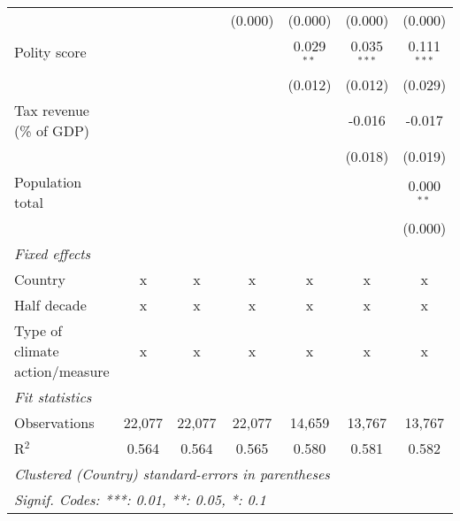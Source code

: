 \begin{tabular}{lcccccc}
                                                                               &         &                & (0.000)        & (0.000)        & (0.000)        & (0.000)\\   
   Polity score                                                                &         &                &                & 0.029$^{**}$   & 0.035$^{***}$  & 0.111$^{***}$\\   
                                                                               &         &                &                & (0.012)        & (0.012)        & (0.029)\\   
   Tax revenue (\% of GDP)                                                     &         &                &                &                & -0.016         & -0.017\\   
                                                                               &         &                &                &                & (0.018)        & (0.019)\\   
   Population total                                                            &         &                &                &                &                & 0.000$^{**}$\\   
                                                                               &         &                &                &                &                & (0.000)\\   
   \emph{Fixed effects}\\
   Country                                                                     & x       & x              & x              & x              & x              & x\\  
   Half decade                                                                 & x       & x              & x              & x              & x              & x\\  
   Type of climate action/measure                                              & x       & x              & x              & x              & x              & x\\  
   \midrule \emph{Fit statistics}\\
   Observations                                                                & 22,077  & 22,077         & 22,077         & 14,659         & 13,767         & 13,767\\  
   R$^2$                                                                       & 0.564   & 0.564          & 0.565          & 0.580          & 0.581          & 0.582\\  
   \midrule
   \multicolumn{7}{l}{\emph{Clustered (Country) standard-errors in parentheses}}\\
   \multicolumn{7}{l}{\emph{Signif. Codes: ***: 0.01, **: 0.05, *: 0.1}}\\
\end{tabular}
\par\endgroup


